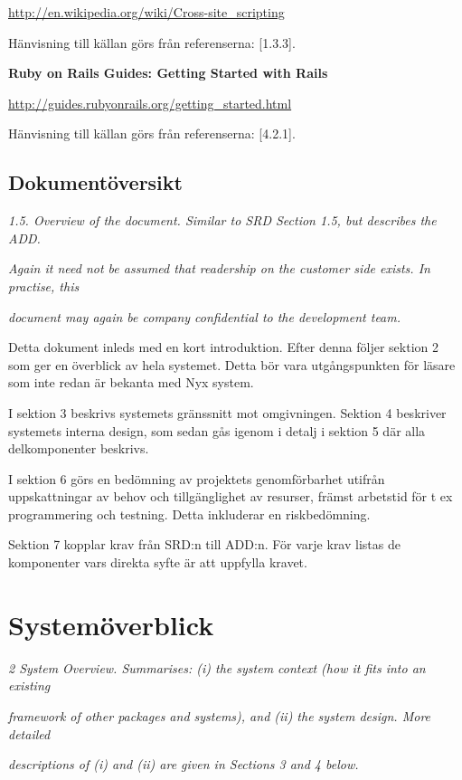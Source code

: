 \documentclass[a4paper, twoside, 11pt, titlepage]{article}
\begin{document}
	\url{http://en.wikipedia.org/wiki/Cross-site_scripting}

	Hänvisning till källan görs från referenserna: [1.3.3].

	\textbf{Ruby on Rails Guides: Getting Started with Rails}

	\url{http://guides.rubyonrails.org/getting_started.html}

	Hänvisning till källan görs från referenserna: [4.2.1].

	\subsection{Dokumentöversikt}


	\emph{1.5. Overview of the document. Similar to SRD Section 1.5, but describes the ADD.}

	\emph{Again it need not be assumed that readership on the customer side exists. In practise, this}

	\emph{document may again be company confidential to the development team.}

	Detta dokument inleds med en kort introduktion. Efter denna följer sektion 2 som ger en överblick av hela systemet. Detta bör vara utgångspunkten för läsare som inte redan är bekanta med Nyx system.

	I sektion 3 beskrivs systemets gränssnitt mot omgivningen. Sektion 4 beskriver systemets interna design, som sedan gås igenom i detalj i sektion 5 där alla delkomponenter beskrivs.

	I sektion 6 görs en bedömning av projektets genomförbarhet utifrån uppskattningar av behov och tillgänglighet av resurser, främst arbetstid för t ex programmering och testning. Detta inkluderar en riskbedömning.

	Sektion 7 kopplar krav från SRD:n till ADD:n. För varje krav listas de komponenter vars direkta syfte är att uppfylla kravet.

\clearpage
\section{Systemöverblick}


\emph{2 System Overview. Summarises: (i) the system context (how it fits into an existing}

\emph{framework of other packages and systems), and (ii) the system design. More detailed}

\emph{descriptions of (i) and (ii) are given in Sections 3 and 4 below.}
\end{document}
